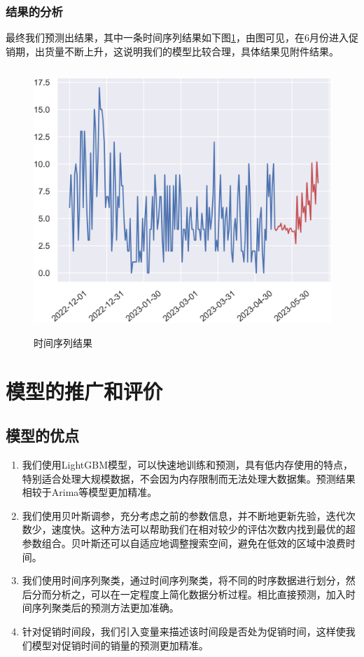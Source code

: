 \documentclass[withoutpreface,bwprint]{cumcmthesis}
\begin{document}
\subsubsection{结果的分析}
  最终我们预测出结果，其中一条时间序列结果如下图\ref{第三问时间序列结果}，由图可见，在6月份进入促销期，出货量不断上升，这说明我们的模型比较合理，具体结果见附件结果。
  \begin{figure}[htbp]
     \centering
     \includegraphics[width=15cm,height=10cm]{figure/第三问时间序列结果.png}%
     \caption{时间序列结果}
     \label{第三问时间序列结果}
    \end{figure}
  

\section{模型的推广和评价}
\subsection{模型的优点}
 \begin{enumerate}
\item 我们使用LightGBM模型，可以快速地训练和预测，具有低内存使用的特点，特别适合处理大规模数据，不会因为内存限制而无法处理大数据集。预测结果相较于Arima等模型更加精准。
\item 我们使用贝叶斯调参，充分考虑之前的参数信息，并不断地更新先验，迭代次数少，速度快。这种方法可以帮助我们在相对较少的评估次数内找到最优的超参数组合。贝叶斯还可以自适应地调整搜索空间，避免在低效的区域中浪费时间。
\item 我们使用时间序列聚类，通过时间序列聚类，将不同的时序数据进行划分，然后分而分析之，可以在一定程度上简化数据分析过程。相比直接预测，加入时间序列聚类后的预测方法更加准确。
\item 针对促销时间段，我们引入变量来描述该时间段是否处为促销时间，这样使我们模型对促销时间的销量的预测更加精准。
\end{enumerate}
\end{document}
